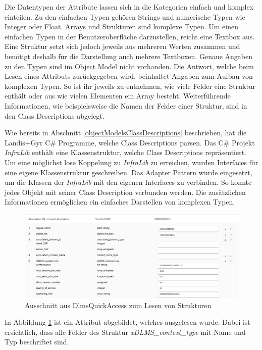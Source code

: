 Die Datentypen der Attribute lassen sich in die Kategorien einfach und komplex einteilen.
Zu den einfachen Typen gehören Strings und numerische Typen wie Integer oder Float.
Arrays und Strukturen sind komplexe Typen.
Um einen einfachen Typen in der Benutzeroberfläche darzustellen, reicht eine Textbox aus.
Eine Struktur setzt sich jedoch jeweils aus mehreren Werten zusammen und benötigt deshalb für die Darstellung auch mehrere Textboxen.
Genaue Angaben zu den Typen sind im Object Model nicht vorhanden.
Die Antwort, welche beim Lesen eines Attributs zurückgegeben wird, beinhaltet Angaben zum Aufbau von komplexen Typen.
So ist ihr jeweils zu entnehmen, wie viele Felder eine Struktur enthält oder aus wie vielen Elementen ein Array besteht.
Weiterführende Informationen, wie beispielsweise die Namen der Felder einer Struktur, sind in den Class Descriptions abgelegt.

Wie bereits in Abschnitt \ref{objectModelsClassDescriptions} beschrieben, hat die Landis+Gyr C\# Programme, welche Class Descriptions parsen.
Das C\# Projekt \textit{InfraLib} enthält eine Klassenstruktur, welche Class Descriptions repräsentiert.
Um eine möglichst lose Koppelung zu \textit{InfraLib} zu erreichen, wurden Interfaces für eine eigene Klassenstruktur geschreiben.
Das Adapter Pattern \parencite{designPatterns} wurde eingesetzt, um die Klassen der \textit{InfraLib} mit den eigenen Interfaces zu verbinden.
So konnte jedes Objekt mit seiner Class Description verbunden werden.
Die zusätzlichen Informationen ermöglichen ein einfaches Darstellen von komplexen Typen.
\begin{figure}
   \centering
   \includegraphics[width=1.0\textwidth]{gfx/AttributeReadExample.png}
   \caption{
      Ausschnitt aus DlmsQuickAccess zum Lesen von Strukturen
      }
      \label{fig:AttributeReadExample}
   \end{figure}
In Abbildung \ref{fig:AttributeReadExample} ist ein Attribut abgebildet, welches ausgelesen wurde.
Dabei ist ersichtlich, dass alle Felder des Struktur \textit{xDLMS\_context\_type} mit Name und Typ beschriftet sind.

